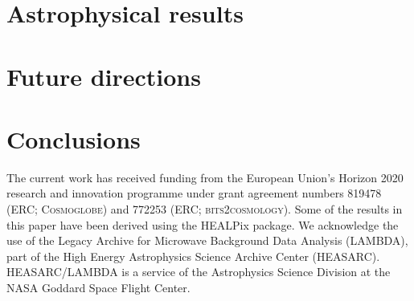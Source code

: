 \documentclass{aa}
\begin{document}



\clearpage
\section{Astrophysical results}


\clearpage
\section{Future directions}

\clearpage
\section{Conclusions}




\blindtext





\begin{acknowledgements}
 The current work has received funding from the European
  Union’s Horizon 2020 research and innovation programme under grant
  agreement numbers 819478 (ERC; \textsc{Cosmoglobe}) and 772253 (ERC;
  \textsc{bits2cosmology}). Some of the results in this paper have been derived using the HEALPix \citep{HEALPIX} package.
  We acknowledge the use of the Legacy Archive for Microwave Background Data
  Analysis (LAMBDA), part of the High Energy Astrophysics Science Archive Center
  (HEASARC). HEASARC/LAMBDA is a service of the Astrophysics Science Division at
  the NASA Goddard Space Flight Center.  
\end{acknowledgements}


%



\end{document}
